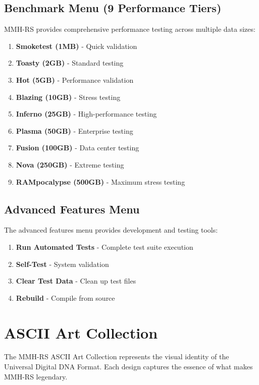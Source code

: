 \documentclass[11pt,a4paper]{article}
\begin{document}
	\subsection{Benchmark Menu (9 Performance Tiers)}

	MMH-RS provides comprehensive performance testing across multiple data sizes:

	\begin{enumerate}
		\item \textbf{Smoketest (1MB)} - Quick validation
		\item \textbf{Toasty (2GB)} - Standard testing
		\item \textbf{Hot (5GB)} - Performance validation
		\item \textbf{Blazing (10GB)} - Stress testing
		\item \textbf{Inferno (25GB)} - High-performance testing
		\item \textbf{Plasma (50GB)} - Enterprise testing
		\item \textbf{Fusion (100GB)} - Data center testing
		\item \textbf{Nova (250GB)} - Extreme testing
		\item \textbf{RAMpocalypse (500GB)} - Maximum stress testing
	\end{enumerate}

	\subsection{Advanced Features Menu}

	The advanced features menu provides development and testing tools:

	\begin{enumerate}
		\item \textbf{Run Automated Tests} - Complete test suite execution
		\item \textbf{Self-Test} - System validation
		\item \textbf{Clear Test Data} - Clean up test files
		\item \textbf{Rebuild} - Compile from source
	\end{enumerate}

	\section{ASCII Art Collection}
	\label{sec:asciiart}

	The MMH-RS ASCII Art Collection represents the visual identity of the Universal Digital DNA Format. Each design captures the essence of what makes MMH-RS legendary.
\end{document}
